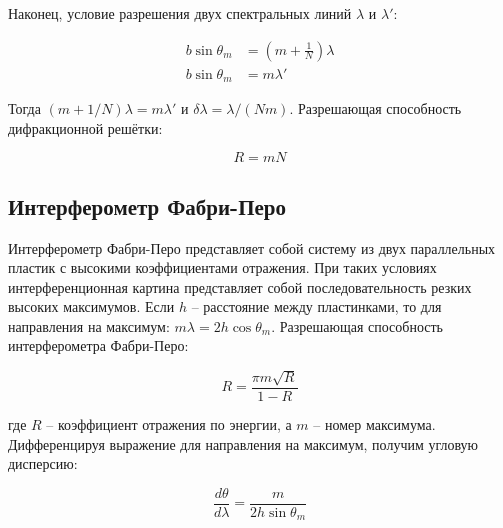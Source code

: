 Наконец, условие разрешения двух спектральных линий $\lambda$ и $\lambda'$:

\begin{align*}
    b \sin \theta_m &= \left( m + \frac{1}{N} \right) \lambda \\
    b \sin \theta_m &= m \lambda'
\end{align*}

\noindent
Тогда $(m + 1 / N) \lambda = m \lambda'$ и $\delta \lambda = \lambda / (N m)$. Разрешающая способность дифракционной решётки:

\begin{equation}
    R = m N
\end{equation}

\subsection{Интерферометр Фабри-Перо}

Интерферометр Фабри-Перо представляет собой систему из двух параллельных пластик с высокими коэффициентами отражения. При таких условиях интерференционная картина представляет собой последовательность резких высоких максимумов. Если $h$ -- расстояние между пластинками, то для направления на максимум: $m \lambda = 2 h \cos \theta_m$. Разрешающая способность интерферометра Фабри-Перо:

\begin{equation}
    R = \frac{\pi m \sqrt{R}}{1 - R}
\end{equation}

\noindent
где $R$ -- коэффициент отражения по энергии, а $m$ -- номер максимума. Дифференцируя выражение для направления на максимум, получим угловую дисперсию:

\begin{equation}
    \frac{d \theta}{d \lambda} = \frac{m}{2 h \sin \theta_m}
\end{equation}